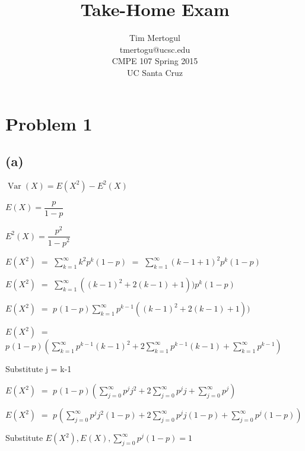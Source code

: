 \documentclass[12pt]{article}
\title{\textbf{Take-Home Exam}}
\author{Tim Mertogul\\tmertogu@ucsc.edu\\CMPE 107 Spring 2015\\UC Santa Cruz}
\begin{document}

  \maketitle
  \pagebreak
  \section*{Problem 1 }   
 
  \subsection*{(a)} 

  $\operatorname{Var} \left({X}\right) = E \left({X^2}\right) - {E^{2} \left({X}\right)}$
    
  $E \left({X}\right) = \dfrac p {1-p}$
  
  $E^{2} \left({X}\right) = \dfrac {p^2} {{1-p}^{2}}$

   \(\displaystyle E \left({X^2}\right)\) \(=\) \(\displaystyle \sum_{k = 1}^{\infty} k^2 p^{k} (1-p)\) \(=\) \(\displaystyle \sum_{k = 1}^{\infty} {(k-1+1)}^2 p^{k} (1-p)\)

   \(\displaystyle E \left({X^2}\right)\) \(=\) \(\displaystyle \sum_{k = 1}^{\infty} {((k-1)^2+2(k-1)+1))} p^{k}(1-p)\)   

   \(\displaystyle E \left({X^2}\right)\) \(=\) \(\displaystyle p^{}(1-p) \sum_{k = 1}^{\infty} {p^{k-1}((k-1)^2+2(k-1)+1))} \)   

   \(\displaystyle E \left({X^2}\right)\) \(=\) \(\displaystyle p^{}(1-p) \left( \sum_{k = 1}^{\infty} {p^{k-1}(k-1)^2} +2 \sum_{k = 1}^{\infty} {p^{k-1}(k-1)} + \sum_{k = 1}^{\infty} {p^{k-1}}\right) \)   

Substitute j = k-1

   \(\displaystyle E \left({X^2}\right)\) \(=\) \(\displaystyle p^{}(1-p) \left( \sum_{j = 0}^{\infty} {p^{j}j^2} +2 \sum_{j = 0}^{\infty} {p^{j}j} + \sum_{j = 0}^{\infty} {p^{j}}\right) \)   

   \(\displaystyle E \left({X^2}\right)\) \(=\) \(\displaystyle p^{} \left( \sum_{j = 0}^{\infty} {p^{j}j^2}(1-p) +2 \sum_{j = 0}^{\infty} {p^{j}j}(1-p) + \sum_{j = 0}^{\infty} {p^{j}(1-p)}\right) \)   

Substitute $E \left({X^{2}}\right), E^{} \left({X}\right), \sum_{j = 0}^{\infty} {p^{j}(1-p)} = 1$
\end{document}
